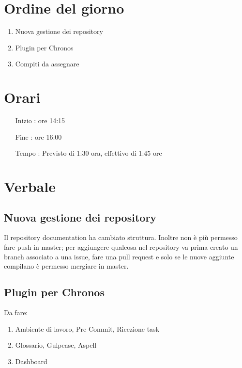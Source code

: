\documentclass[11pt]{meetingmins}
\begin{document}
\maketitle

\section{Ordine del giorno}

\begin{enumerate}

  \item Nuova gestione dei repository
  \item Plugin per Chronos
  \item Compiti da assegnare

\end{enumerate}

\section{Orari}

\begin{itemize}
\item[Inizio]: ore 14:15
\item[Fine]: ore 16:00
\item[Tempo]: Previsto di 1:30 ora, effettivo di 1:45 ore

\end{itemize}

\section{Verbale}

\subsection{Nuova gestione dei repository}
Il repository documentation ha cambiato struttura. Inoltre non è più permesso fare push in master; per aggiungere qualcosa nel repository va prima creato un branch associato a una issue, fare una pull request e solo se le nuove aggiunte compilano è permesso mergiare in master.

\subsection{Plugin per Chronos}

Da fare:

\begin{enumerate}
\item Ambiente di lavoro, Pre Commit, Ricezione task
\item Glossario, Gulpease, Aspell
\item Dashboard
\end{enumerate}
\end{document}

